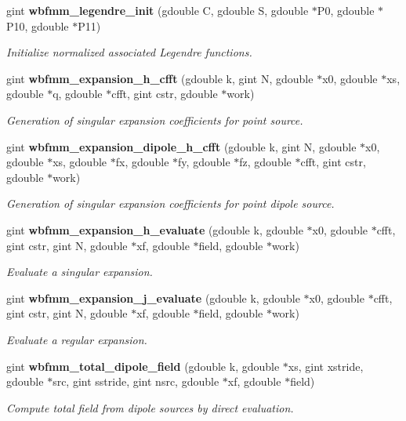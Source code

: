 \begin{DoxyCompactItemize}
gint \textbf{ wbfmm\+\_\+legendre\+\_\+init} (gdouble C, gdouble S, gdouble $\ast$P0, gdouble $\ast$P10, gdouble $\ast$P11)
\begin{DoxyCompactList}\small\item\em Initialize normalized associated Legendre functions. \end{DoxyCompactList}\item 
gint \textbf{ wbfmm\+\_\+expansion\+\_\+h\+\_\+cfft} (gdouble k, gint N, gdouble $\ast$x0, gdouble $\ast$xs, gdouble $\ast$q, gdouble $\ast$cfft, gint cstr, gdouble $\ast$work)
\begin{DoxyCompactList}\small\item\em Generation of singular expansion coefficients for point source. \end{DoxyCompactList}\item 
gint \textbf{ wbfmm\+\_\+expansion\+\_\+dipole\+\_\+h\+\_\+cfft} (gdouble k, gint N, gdouble $\ast$x0, gdouble $\ast$xs, gdouble $\ast$fx, gdouble $\ast$fy, gdouble $\ast$fz, gdouble $\ast$cfft, gint cstr, gdouble $\ast$work)
\begin{DoxyCompactList}\small\item\em Generation of singular expansion coefficients for point dipole source. \end{DoxyCompactList}\item 
gint \textbf{ wbfmm\+\_\+expansion\+\_\+h\+\_\+evaluate} (gdouble k, gdouble $\ast$x0, gdouble $\ast$cfft, gint cstr, gint N, gdouble $\ast$xf, gdouble $\ast$field, gdouble $\ast$work)
\begin{DoxyCompactList}\small\item\em Evaluate a singular expansion. \end{DoxyCompactList}\item 
gint \textbf{ wbfmm\+\_\+expansion\+\_\+j\+\_\+evaluate} (gdouble k, gdouble $\ast$x0, gdouble $\ast$cfft, gint cstr, gint N, gdouble $\ast$xf, gdouble $\ast$field, gdouble $\ast$work)
\begin{DoxyCompactList}\small\item\em Evaluate a regular expansion. \end{DoxyCompactList}\item 
gint \textbf{ wbfmm\+\_\+total\+\_\+dipole\+\_\+field} (gdouble k, gdouble $\ast$xs, gint xstride, gdouble $\ast$src, gint sstride, gint nsrc, gdouble $\ast$xf, gdouble $\ast$field)
\begin{DoxyCompactList}\small\item\em Compute total field from dipole sources by direct evaluation. \end{DoxyCompactList}\item 

\end{DoxyCompactItemize}
